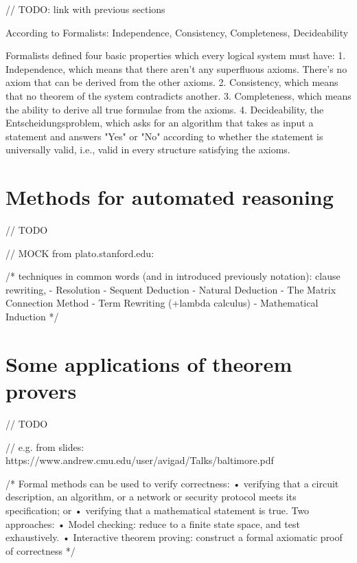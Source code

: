 \documentclass[article]{aaltoseries}
\begin{document}
// TODO: link with previous sections

According to Formalists: Independence, Consistency, Completeness, Decideability

Formalists defined four basic properties which every logical system must have:
1. Independence, which means that there aren’t any superfluous axioms. There’s no axiom that can be derived from the other axioms.
2. Consistency, which means that no theorem of the system contradicts another.
3. Completeness, which means the ability to derive all true formulae from the axioms.
4. Decideability, the Entscheidungsproblem, which asks for an algorithm that takes as input a statement and answers "Yes" or "No" according to whether the statement is universally valid, i.e., valid in every structure satisfying the axioms.


\section{Methods for automated reasoning}
\label{sec:auto_reasoning}

// TODO

// MOCK from plato.stanford.edu:  %

/* techniques in common words (and in introduced previously notation): clause rewriting, 
- Resolution
- Sequent Deduction
- Natural Deduction
- The Matrix Connection Method
- Term Rewriting (+lambda calculus)
- Mathematical Induction
*/



\section{Some applications of theorem provers}
\label{sec:applications}

// TODO 

// e.g. from slides: https://www.andrew.cmu.edu/user/avigad/Talks/baltimore.pdf

/* Formal methods can be used to verify correctness:
• verifying that a circuit description, an algorithm, or a network or security protocol meets its specification; or
• verifying that a mathematical statement is true.
Two approaches:
• Model checking: reduce to a finite state space, and test exhaustively.
• Interactive theorem proving: construct a formal axiomatic proof of correctness
*/
\end{document}
